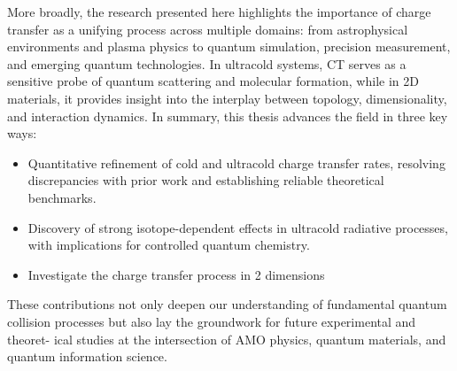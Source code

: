 More broadly, the research presented here highlights the importance of charge transfer as a unifying process across multiple domains: from astrophysical environments and plasma physics to quantum simulation, precision measurement, and emerging quantum technologies. In ultracold systems, CT serves as a sensitive probe of quantum scattering and molecular formation, while in 2D materials, it provides insight into the interplay between topology, dimensionality, and interaction dynamics.  In summary, this thesis advances the field in three key ways:

\begin{itemize}
\item Quantitative refinement of cold and ultracold charge transfer rates, resolving discrepancies with prior work and establishing reliable theoretical benchmarks.

\item Discovery of strong isotope-dependent effects in ultracold radiative processes, with implications for controlled quantum chemistry.

\item Investigate the charge transfer process in 2 dimensions

\end{itemize}

These contributions not only deepen our understanding of fundamental quantum collision processes but also lay the groundwork for future experimental and theoret- ical studies at the intersection of AMO physics, quantum materials, and quantum information science.
